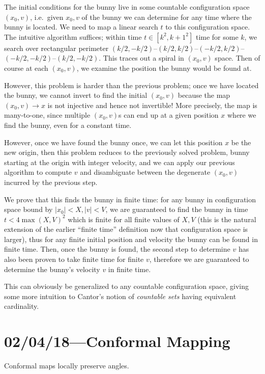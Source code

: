 \documentclass[12pt]{report}
\newcommand{\abs}[1]{\left|#1\right|}
\begin{document}
The initial conditions for the bunny live in some countable configuration space
$(x_0, v)$, i.e.\ given $x_0, v$ of the bunny we can determine for any time
where the bunny is located. We need to map a linear search $t$ to this
configuration space. The intuitive algorithm suffices; within time $t \in [k^2,
k + 1^2]$ time for some $k$, we search over rectangular perimeter $(k/2,
-k/2)$--$(k/2, k/2)$--$(-k/2, k/2)$--$(-k/2, -k/2)$--$(k/2, -k/2)$. This traces
out a spiral in $(x_0, v)$ space. Then of course at each $(x_0, v)$, we examine
the position the bunny would be found at.

However, this problem is harder than the previous problem; once we have located
the bunny, we cannot invert to find the initial $(x_0, v)$ because the map
$(x_0, v) \to x$ is not injective and hence not invertible! More precisely, the
map is many-to-one, since multiple $(x_0, v)$s can end up at a given position
$x$ where we find the bunny, even for a constant time.

However, once we have found the bunny once, we can let this position $x$ be the
new origin, then this problem reduces to the previously solved problem, bunny
starting at the origin with integer velocity, and we can apply our previous
algorithm to compute $v$ and disambiguate between the degenerate $(x_0, v)$
incurred by the previous step.

We prove that this finds the bunny in finite time: for any bunny in
configuration space bound by $\abs{x_0} < X, \abs{v} < V$, we are guaranteed to
find the bunny in time $t < 4\max(X, V)^2$ which is finite for all finite values
of $X, V$ (this is the natural extension of the earlier ``finite time''
definition now that configuration space is larger), thus for any finite initial
position and velocity the bunny can be found in finite time. Then, once the
bunny is found, the second step to determine $v$ has also been proven to take
finite time for finite $v$, therefore we are guaranteed to determine the bunny's
velocity $v$ in finite time.

This can obviously be generalized to any countable configuration space, giving
some more intuition to Cantor's notion of \emph{countable sets} having
equivalent cardinality.

\chapter{02/04/18---Conformal Mapping}

Conformal maps locally preserve angles.
\end{document}
